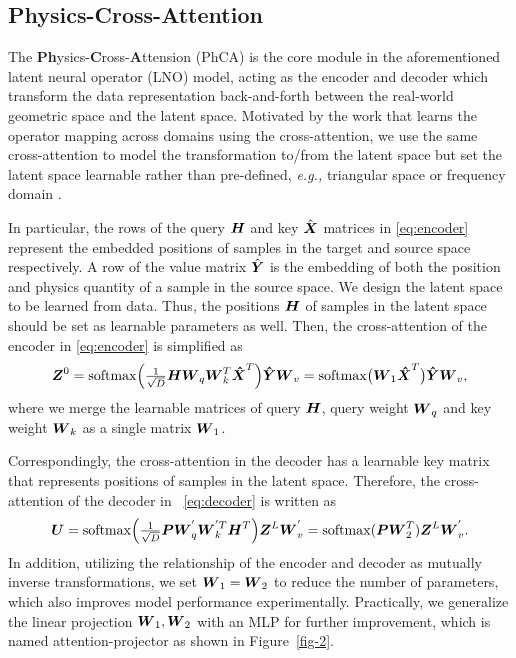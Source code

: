 \documentclass{article}
\begin{document}
\vspace{-5pt}
\subsection{Physics-Cross-Attention}
\label{PhCA}
The \textbf {Ph}ysics-\textbf{C}ross-\textbf{A}ttension (PhCA) is the core module in the aforementioned latent neural operator (LNO) model, acting as the encoder and decoder which transform the data representation back-and-forth between the real-world geometric space and the latent space. Motivated by the work \cite{LSM} that learns the operator mapping across domains using the cross-attention, we use the same cross-attention to model the transformation to/from the latent space but set the latent space learnable rather than pre-defined, {\em e.g., } triangular space or frequency domain \cite{FNO}.

In particular, the rows of the query $\boldsymbol{H}$ and key $\hat{\boldsymbol{X}}$ matrices in \eqref{eq:encoder} represent the embedded positions of samples in the target and source space respectively. A row of the value matrix $\hat{\boldsymbol{Y}}$ is the embedding of both the position and physics quantity of a sample in the source space. We design the latent space to be learned from data. Thus, the positions $\boldsymbol{H}$ of samples in the latent space should be set as learnable parameters as well. Then, the cross-attention of the encoder in \eqref{eq:encoder} is simplified as
\begin{equation} \label{eq:encoder-sim}
\boldsymbol{Z}^0  ={\rm softmax}\Big(\tfrac{1}{\sqrt{D}}\boldsymbol{H}\boldsymbol{W}_{q}\boldsymbol{W}_k^T\boldsymbol{\hat{X}}^T
\Big)
\boldsymbol{\hat{Y}}\boldsymbol{W}_v
={\rm softmax}\big(\boldsymbol{W}_1\boldsymbol{\hat{X}}^T \big)\boldsymbol{\hat{Y}}\boldsymbol{W}_v,
\end{equation}
where we merge the learnable matrices of query $\boldsymbol{H}$, query weight $\boldsymbol{W}_q$ and key weight $\boldsymbol{W}_k$ as a single matrix $\boldsymbol{W}_1$.

Correspondingly, the cross-attention in the decoder has a learnable key matrix that represents positions of samples in the latent space. Therefore, the cross-attention of the decoder in ~\eqref{eq:decoder} is written as
\begin{equation} \label{eq:decoder-sim}
 \boldsymbol{U}={\rm softmax}\Big(
 \tfrac{1}{\sqrt{D}} \boldsymbol{P}\boldsymbol{W}_q^{'}\boldsymbol{W}_k^{'T}\boldsymbol{H}^T
 \Big)
 \boldsymbol{Z}^L\boldsymbol{W}_v^{'}={\rm softmax}(\boldsymbol{P}\boldsymbol{W}_2^T)\boldsymbol{Z}^L\boldsymbol{W}_v^{'}.
\end{equation}
In addition, utilizing the relationship of the encoder and decoder as mutually inverse transformations, we set $\boldsymbol{W}_1=\boldsymbol{W}_2$ to reduce the number of parameters, which also improves model performance experimentally. Practically, we generalize the linear projection $\boldsymbol{W}_1,\boldsymbol{W}_2$ with an MLP for further improvement, which is named attention-projector as shown in Figure~\ref{fig-2}.
\end{document}
